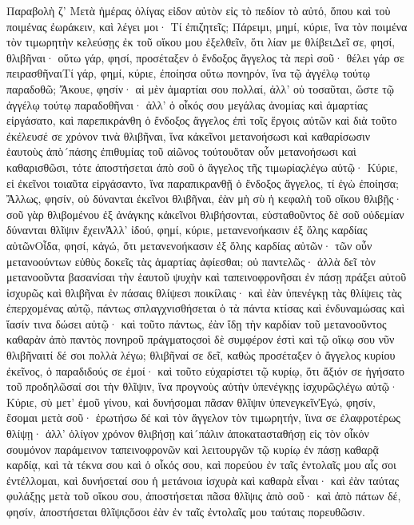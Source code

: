 Παραβολὴ ζ’ 
Μετὰ ἡμέρας ὀλίγας εἰδον αὐτὸν εἰς τὸ πεδίον τὸ αὐτό, ὅπου καὶ τοὺ ποιμένας ἐωράκειν, καὶ λέγει μοι· Τί ἐπιζητεῖς; Πάρειμι, μημί, κύριε, ἵνα τὸν ποιμένα τὸν τιμωρητὴν κελεύσῃς ἐκ τοῦ οἴκου μου ἐξελθεῖν, ὅτι λίαν με θλίβειΔεῖ σε, φησί, θλιβῆναι· οὕτω γάρ, φησί, προσέταξεν ὁ ἔνδοξος ἄγγελος τὰ περὶ σοῦ· θέλει γάρ σε πειρασθῆναιΤί γάρ, φημί, κύριε, ἐποίησα οὕτω πονηρόν, ἵνα τῷ ἀγγέλῳ τούτῳ παραδοθῶ; Ἄκουε, φησίν· αἱ μὲν ἁμαρτίαι σου πολλαί, ἀλλ’ οὐ τοσαῦται, ὥστε τῷ ἀγγέλῳ τούτῳ παραδοθῆναι· ἀλλ’ ὁ οἶκός σου μεγάλας ἀνομίας καὶ ἁμαρτίας εἰργάσατο, καὶ παρεπικράνθη ὁ ἔνδοξος ἄγγελος ἐπὶ τοῖς ἔργοις αὐτῶν καὶ διὰ τοῦτο ἐκέλευσέ σε χρόνον τινὰ θλιβῆναι, ἵνα κἀκεῖνοι μετανοήσωσι καὶ καθαρίσωσιν ἑαυτοὺς ἀπὸ´πάσης ἐπιθυμίας τοῦ αἰῶνος τούτουὅταν οὖν μετανοήσωσι καὶ καθαρισθῶσι, τότε ἀποστήσεται ἀπὸ σοῦ ὁ ἄγγελος τῆς τιμωρίαςλέγω αὐτῷ· Κύριε, εἰ ἐκεῖνοι τοιαῦτα εἰργάσαντο, ἵνα παραπικρανθῇ ὁ ἔνδοξος ἄγγελος, τί ἐγὼ ἐποίησα; Ἄλλως, φησίν, οὐ δύνανται ἐκεῖνοι θλιβῆναι, ἐὰν μὴ σὺ ἡ κεφαλὴ τοῦ οἴκου θλιβῇς· σοῦ γὰρ θλιβομένου ἐξ ἀνάγκης κἀκεῖνοι θλιβήσονται, εὐσταθοῦντος δὲ σοῦ οὐδεμίαν δύνανται θλῖψιν ἔχεινἈλλ’ ἰδού, φημί, κύριε, μετανενοήκασιν ἐξ ὅλης καρδίας αὐτῶνΟἶδα, φησί, κἀγώ, ὅτι μετανενοήκασιν ἐξ ὅλης καρδίας αὐτῶν· τῶν οὖν μετανοούντων εὐθὺς δοκεῖς τὰς ἁμαρτίας ἀφίεσθαι; οὐ παντελῶς· ἀλλὰ δεῖ τὸν μετανοοῦντα βασανίσαι τὴν ἑαυτοῦ ψυχὴν καὶ ταπεινοφρονῆσαι ἐν πάσῃ πράξει αὐτοῦ ἰσχυρῶς καὶ θλιβῆναι ἐν πάσαις θλίψεσι ποικίλαις· καὶ ἐὰν ὑπενέγκῃ τὰς θλίψεις τὰς ἐπερχομένας αὐτῷ, πάντως σπλαγχνισθήσεται ὁ τὰ πάντα κτίσας καὶ ἐνδυναμώσας καὶ ἴασίν τινα δώσει αὐτῷ· καὶ τοῦτο πάντως, ἐὰν ἴδῃ τὴν καρδίαν τοῦ μετανοοῦντος καθαρὰν ἀπὸ παντὸς πονηροῦ πράγματοςσοὶ δὲ συμφέρον ἐστὶ καὶ τῷ οἴκῳ σου νῦν θλιβῆναιτί δέ σοι πολλὰ λέγω; θλιβῆναί σε δεῖ, καθὼς προσέταξεν ὁ ἄγγελος κυρίου ἐκεῖνος, ὁ παραδιδούς σε ἐμοί· καὶ τοῦτο εὐχαρίστει τῷ κυρίῳ, ὅτι ἄξιόν σε ἡγήσατο τοῦ προδηλῶσαί σοι τὴν θλῖψιν, ἵνα προγνοὺς αὐτὴν ὑπενέγκῃς ἰσχυρῶςλέγω αὐτῷ· Κύριε, σὺ μετ’ ἐμοῦ γίνου, καὶ δυνήσομαι πᾶσαν θλῖψιν ὐπενεγκεῖνἘγώ, φησίν, ἔσομαι μετὰ σοῦ· ἐρωτήσω δέ καὶ τὸν ἄγγελον τὸν τιμωρητήν, ἵινα σε ἐλαφροτέρως θλίψῃ· ἀλλ’ ὀλίγον χρόνον θλιβήσῃ καὶ´πάλιν ἀποκατασταθήσῃ εἰς τὸν οἶκόν σουμόνον παράμεινον ταπεινοφρονῶν καὶ λειτουργῶν τῷ κυρίῳ ἐν πάσῃ καθαρᾷ καρδίᾳ, καὶ τὰ τέκνα σου καὶ ὁ οἶκός σου, καὶ πορεύου ἐν ταῖς ἐντολαῖς μου αἷς σοι ἐντέλλομαι, καὶ δυνήσεταί σου ἡ μετάνοια ἰσχυρὰ καὶ καθαρὰ εἶναι· καὶ ἐὰν ταύτας φυλάξῃς μετὰ τοῦ οἴκου σου, ἀποστήσεται πᾶσα θλῖψις ἀπὸ σοῦ· καὶ ἀπὸ πάτων δέ, φησίν, ἀποστήσεται θλῖψιςὅσοι ἐὰν ἐν ταῖς ἐντολαῖς μου ταύταις πορευθῶσιν.

